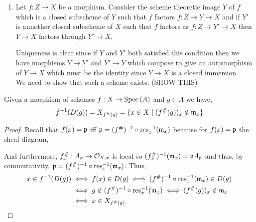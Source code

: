 \documentclass[12pt]{article}
\begin{document}
\begin{enumerate}
\item Let $f : Z \to X$ be a morphism. Consider the scheme theoretic image $Y$ of $f$ which is a closed subscheme of $Y$ such that $f$ factors $f : Z \to Y \to X$ and if $Y'$ is annother closed subscheme of $X$ such that $f$ factors as $f : Z \to Y' \to X$ then $Y \to X$ factors through $Y' \to X$,
\begin{center}
\end{center}
Uniqueness is clear since if $Y$ and $Y'$ both satisfied this condition then we have morphisms $Y \to Y'$ and $Y' \to Y$ which compose to give an automorphism of $Y \to X$ which must be the identity since $Y \to X$ is a closed immersion.
\bigskip\\
We need to show that such a scheme exists. (SHOW THIS)
\end{enumerate}

\begin{lemma}
Given a morphism of schemes $f : X \to \mathrm{Spec}\left( A \right)$ and $g \in A$ we have, 
\[ f^{-1}(D(g)) = X_{f^\#(g)} = \{ x \in X \mid (f^\#(g))_x \notin \mathfrak{m}_x \} \]
\end{lemma}

\begin{proof}
Recall that $f(x) = \mathfrak{p}$ iff $\mathfrak{p} = (f^\#)^{-1} \circ \mathrm{res}_x^{-1}(\mathfrak{m}_x)$ because for $f(x) = \mathfrak{p}$ the sheaf diagram,
\begin{center}
\end{center} 
And furthermore, $f^\#_x : A_{\mathfrak{p}} \to \mathcal{O}_{X, x}$ is local so $(f^\#_x)^{-1}(\mathfrak{m}_x) = \mathfrak{p} A_{\mathfrak{p}}$ and thus, by commutativity, $\mathfrak{p} = (f^\#)^{-1} \circ \mathrm{res}_x^{-1}(\mathfrak{m}_x)$. 
Thus,
\begin{align*}
x \in f^{-1}(D(g)) & \iff f(x) \in D(g) \iff (f^\#)^{-1} \circ \mathrm{res}_x^{-1} (\mathfrak{m}_x) \in D(g) 
\\
& \iff g \notin (f^\#)^{-1} \circ \mathrm{res}_{x}^{-1} (\mathfrak{m}_x) \iff (f^\#(g))_x \notin \mathfrak{m}_x 
\\
& \iff x \in X_{f^\#(g)}
\end{align*}
\end{proof}
\end{document}
